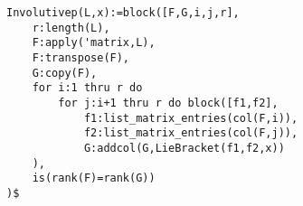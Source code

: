 \noindent
\begin{minipage}[t]{\textwidth}
\color{blue}
\begin{verbatim}
Involutivep(L,x):=block([F,G,i,j,r],
    r:length(L),
    F:apply('matrix,L),
    F:transpose(F),
    G:copy(F),  
    for i:1 thru r do 
        for j:i+1 thru r do block([f1,f2],
            f1:list_matrix_entries(col(F,i)),
            f2:list_matrix_entries(col(F,j)),
            G:addcol(G,LieBracket(f1,f2,x))
    ),
    is(rank(F)=rank(G))
)$
\end{verbatim}
\end{minipage}
